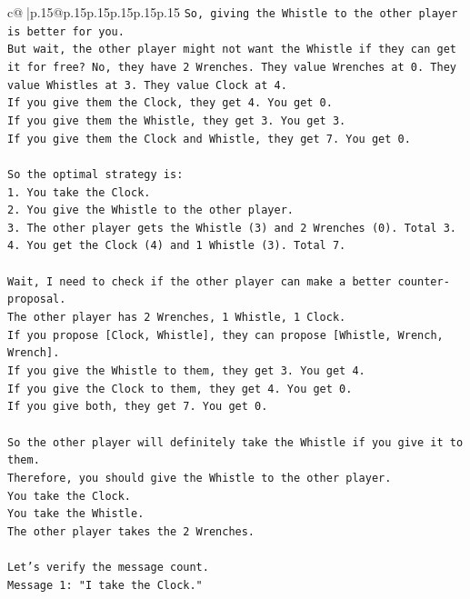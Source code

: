 \documentclass{article}
\begin{document}
{\begin{supertabular}{c@{$\;$}|p{.15\linewidth}@{}p{.15\linewidth}p{.15\linewidth}p{.15\linewidth}p{.15\linewidth}p{.15\linewidth}}
{{{\texttt{So, giving the Whistle to the other player is better for you.} \\
\texttt{But wait, the other player might not want the Whistle if they can get it for free? No, they have 2 Wrenches. They value Wrenches at 0. They value Whistles at 3. They value Clock at 4.} \\
\texttt{If you give them the Clock, they get 4. You get 0.} \\
\texttt{If you give them the Whistle, they get 3. You get 3.} \\
\texttt{If you give them the Clock and Whistle, they get 7. You get 0.} \\
\\ 
\texttt{So the optimal strategy is:} \\
\texttt{1. You take the Clock.} \\
\texttt{2. You give the Whistle to the other player.} \\
\texttt{3. The other player gets the Whistle (3) and 2 Wrenches (0). Total 3.} \\
\texttt{4. You get the Clock (4) and 1 Whistle (3). Total 7.} \\
\\ 
\texttt{Wait, I need to check if the other player can make a better counter{-}proposal.} \\
\texttt{The other player has 2 Wrenches, 1 Whistle, 1 Clock.} \\
\texttt{If you propose {[}Clock, Whistle{]}, they can propose {[}Whistle, Wrench, Wrench{]}.} \\
\texttt{If you give the Whistle to them, they get 3. You get 4.} \\
\texttt{If you give the Clock to them, they get 4. You get 0.} \\
\texttt{If you give both, they get 7. You get 0.} \\
\\ 
\texttt{So the other player will definitely take the Whistle if you give it to them.} \\
\texttt{Therefore, you should give the Whistle to the other player.} \\
\texttt{You take the Clock.} \\
\texttt{You take the Whistle.} \\
\texttt{The other player takes the 2 Wrenches.} \\
\\ 
\texttt{Let's verify the message count.} \\
\texttt{Message 1: "I take the Clock."} \\
}}}
\end{supertabular}}
\end{document}
